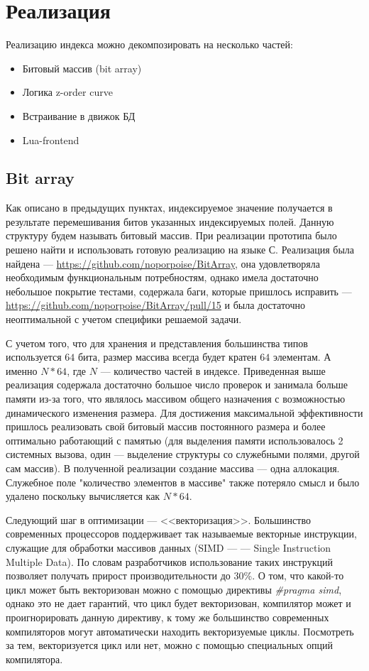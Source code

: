 \chapter{Реализация} \label{chapt3}

Реализацию индекса можно декомпозировать на несколько частей:
\begin{itemize}
	\item Битовый массив (bit array)
	\item Логика z-order curve
	\item Встраивание в движок БД
	\item Lua-frontend
\end{itemize}

\section{Bit array}
Как описано в предыдущих пунктах, индексируемое значение получается
в результате перемешивания битов указанных индексируемых полей.
Данную структуру будем называть битовый массив. При реализации прототипа
было решено найти и использовать готовую реализацию на языке С.
Реализация была найдена --- \url{https://github.com/noporpoise/BitArray},
она удовлетворяла необходимым функциональным потребностям, однако имела
достаточно небольшое покрытие тестами, содержала баги, которые пришлось
исправить --- \url{https://github.com/noporpoise/BitArray/pull/15} и
была достаточно неоптимальной с учетом специфики решаемой задачи.

С учетом того, что для хранения и представления
большинства типов используется $64$ бита, размер массива всегда будет
кратен $64$ элементам. А именно $N * 64$, где $N$ --- количество частей
в индексе. Приведенная выше реализация содержала достаточно большое
число проверок и занимала больше памяти из-за того,
что являлось массивом общего назначения с возможностью динамического
изменения размера.
Для достижения максимальной эффективности пришлось реализовать свой
битовый массив постоянного размера и более оптимально работающий с
памятью (для выделения памяти использовалось 2 системных вызова,
один --- выделение структуры со служебными полями, другой сам массив).
В полученной реализации создание массива --- одна аллокация.
Служебное поле "количество элементов в массиве" также потеряло смысл
и было удалено поскольку вычисляется как $N * 64$.

Следующий шаг в оптимизации --- <<векторизация>>.
Большинство современных процессоров поддерживает так называемые
векторные инструкции, служащие для обработки массивов данных
(SIMD --- — Single Instruction Multiple Data).
По словам разработчиков использование таких инструкций позволяет
получать прирост производительности до 30\%.
О том, что какой-то цикл может быть векторизован можно с
помощью директивы \textit{\#pragma simd},
однако это не дает гарантий, что цикл будет векторизован,
компилятор может и проигнорировать данную директиву, к тому же
большинство современных компиляторов могут автоматически находить
векторизуемые циклы. Посмотреть за тем, векторизуется цикл или нет,
можно с помощью специальных опций компилятора.

